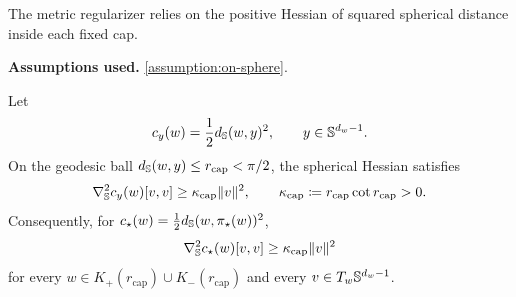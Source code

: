 The metric regularizer relies on the positive Hessian of squared spherical distance inside each fixed cap.
\begin{lemma}
\label{lem:spherical-squared-distance-Hessian-on-caps}
\textbf{Assumptions used.} \cref{assumption:on-sphere}.

Let
\[
    c_y(w)=\frac12d_{\mathbb{S}}(w,y)^2,
    \qquad
    y\in\mathbb{S}^{d_w-1}.
\]
On the geodesic ball \(d_{\mathbb{S}}(w,y)\le r_{\mathrm{cap}}<\pi/2\), the spherical Hessian satisfies
\begin{equation}
\label{eq:spherical-distance-Hessian-lower-bound}
    \nabla_{\mathbb{S}}^2c_y(w)[v,v]
    \ge
    \kappa_{\mathrm{cap}}\|v\|^2,
    \qquad
    \kappa_{\mathrm{cap}}
    \coloneq
    r_{\mathrm{cap}}\cot r_{\mathrm{cap}}>0.
\end{equation}
Consequently, for \(c_\star(w)=\frac12d_{\mathbb{S}}(w,\pi_\star(w))^2\),
\begin{equation}
\label{eq:cstar-Hessian-lower-bound}
    \nabla_{\mathbb{S}}^2c_\star(w)[v,v]
    \ge
    \kappa_{\mathrm{cap}}
    \|v\|^2
\end{equation}
for every \(w\in K_+(r_{\mathrm{cap}})\cup K_-(r_{\mathrm{cap}})\) and every
\(v\in T_w\mathbb{S}^{d_w-1}\).
\end{lemma}

